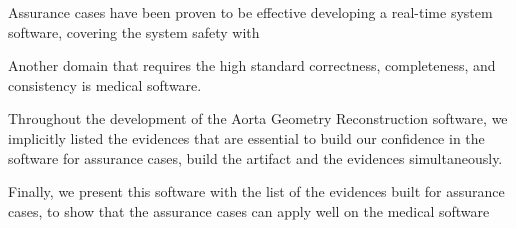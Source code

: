 
Assurance cases have been proven to be effective developing a real-time system software, covering the system safety with 

Another domain that requires the high standard correctness, completeness, and consistency is medical software.

Throughout the development of the Aorta Geometry Reconstruction software, we implicitly listed the evidences that are essential to build our confidence in the software for assurance cases, build the artifact and the evidences simultaneously. 

Finally, we present this software with the list of the evidences built for assurance cases, to show that the assurance cases can apply well on the medical software